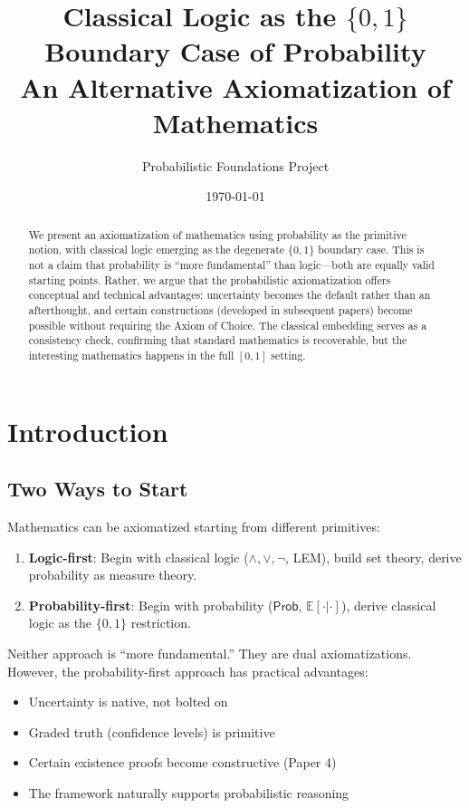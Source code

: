 \documentclass[11pt,a4paper]{article}
\title{Classical Logic as the $\{0,1\}$ Boundary Case of Probability\\[0.5em]
\large An Alternative Axiomatization of Mathematics}
\author{Probabilistic Foundations Project}
\date{\today}
\newcommand{\Prob}{\mathsf{Prob}}
\newcommand{\E}{\mathbb{E}}
\begin{document}
\maketitle

\begin{abstract}
We present an axiomatization of mathematics using probability as the primitive notion, with classical logic emerging as the degenerate $\{0,1\}$ boundary case. This is not a claim that probability is ``more fundamental'' than logic---both are equally valid starting points. Rather, we argue that the probabilistic axiomatization offers conceptual and technical advantages: uncertainty becomes the default rather than an afterthought, and certain constructions (developed in subsequent papers) become possible without requiring the Axiom of Choice. The classical embedding serves as a consistency check, confirming that standard mathematics is recoverable, but the interesting mathematics happens in the full $[0,1]$ setting.
\end{abstract}

\section{Introduction}

\subsection{Two Ways to Start}

Mathematics can be axiomatized starting from different primitives:

\begin{enumerate}[label=(\roman*)]
    \item \textbf{Logic-first}: Begin with classical logic ($\land, \lor, \neg$, LEM), build set theory, derive probability as measure theory.
    \item \textbf{Probability-first}: Begin with probability ($\Prob$, $\E[\cdot|\cdot]$), derive classical logic as the $\{0,1\}$ restriction.
\end{enumerate}

Neither approach is ``more fundamental.'' They are dual axiomatizations. However, the probability-first approach has practical advantages:

\begin{itemize}
    \item Uncertainty is native, not bolted on
    \item Graded truth (confidence levels) is primitive
    \item Certain existence proofs become constructive (Paper 4)
    \item The framework naturally supports probabilistic reasoning
\end{itemize}
\end{document}
